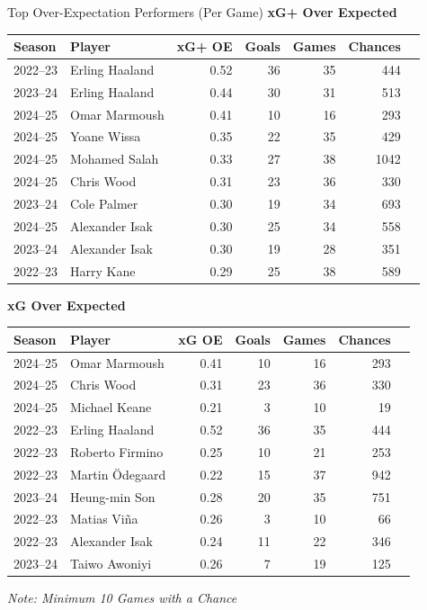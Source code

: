 \documentclass{beamer}
\begin{document}
\begin{frame}{Top Over-Expectation Performers (Per Game)}
\tiny
\centering
\textbf{xG+ Over Expected} \\
\vspace{0.1cm}
\begin{tabular}{llrrrrr}
\toprule
\textbf{Season} & \textbf{Player} & \textbf{xG+ OE} & \textbf{Goals} & \textbf{Games} & \textbf{Chances} \\
\midrule
2022--23 & Erling Haaland     & 0.52 & 36 & 35 & 444 \\
2023--24 & Erling Haaland     & 0.44 & 30 & 31 & 513 \\
2024--25 & Omar Marmoush      & 0.41 & 10 & 16 & 293 \\
2024--25 & Yoane Wissa        & 0.35 & 22 & 35 & 429 \\
2024--25 & Mohamed Salah      & 0.33 & 27 & 38 &1042 \\
2024--25 & Chris Wood         & 0.31 & 23 & 36 & 330 \\
2023--24 & Cole Palmer        & 0.30 & 19 & 34 & 693 \\
2024--25 & Alexander Isak     & 0.30 & 25 & 34 & 558 \\
2023--24 & Alexander Isak     & 0.30 & 19 & 28 & 351 \\
2022--23 & Harry Kane         & 0.29 & 25 & 38 & 589 \\
\bottomrule
\end{tabular}

\vspace{0.25cm}
\textbf{xG Over Expected} \\
\vspace{0.1cm}
\begin{tabular}{llrrrrr}
\toprule
\textbf{Season} & \textbf{Player} & \textbf{xG OE} & \textbf{Goals} & \textbf{Games} & \textbf{Chances} \\
\midrule
2024--25 & Omar Marmoush      & 0.41 & 10 & 16 & 293 \\
2024--25 & Chris Wood         & 0.31 & 23 & 36 & 330 \\
2024--25 & Michael Keane      & 0.21 &  3 & 10 &  19 \\
2022--23 & Erling Haaland     & 0.52 & 36 & 35 & 444 \\
2022--23 & Roberto Firmino    & 0.25 & 10 & 21 & 253 \\
2022--23 & Martin Ödegaard    & 0.22 & 15 & 37 & 942 \\
2023--24 & Heung-min Son      & 0.28 & 20 & 35 & 751 \\
2022--23 & Matias Viña        & 0.26 &  3 & 10 &  66 \\
2022--23 & Alexander Isak     & 0.24 & 11 & 22 & 346 \\
2023--24 & Taiwo Awoniyi      & 0.26 &  7 & 19 & 125 \\
\bottomrule
\end{tabular}

\vspace{0.1cm}
\emph{Note: Minimum 10 Games with a Chance}
\end{frame}
\end{document}
